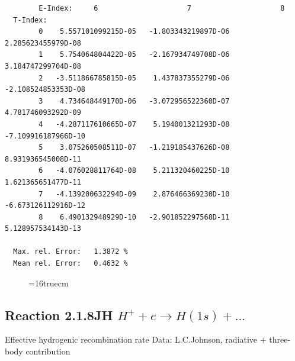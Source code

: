 \documentclass[12pt,dvips]{article}
\begin{document}
\begin{small}
\begin{verbatim}
        E-Index:     6                     7                     8
  T-Index:
        0    5.557101099215D-05   -1.803343219897D-06    2.285623455979D-08
        1    5.754064804422D-05   -2.167934749708D-06    3.184747299704D-08
        2   -3.511866785815D-05    1.437837355279D-06   -2.108524853353D-08
        3    4.734648449170D-06   -3.072956522360D-07    4.781746093292D-09
        4   -4.287117610665D-07    5.194001321293D-08   -7.109916187966D-10
        5    3.075260508511D-07   -1.219185437626D-08    8.931936545008D-11
        6   -4.076028811764D-08    5.211320460225D-10    1.621365651477D-11
        7   -4.139200632294D-09    2.876466369230D-10   -6.673126112916D-12
        8    6.490132948929D-10   -2.901852297568D-11    5.128957534143D-13

  Max. rel. Error:   1.3872 %
  Mean rel. Error:   0.4632 %

\end{verbatim}\end{small}
\begin{figure} \label{2.1.5FU}
\epsfxsize=16truecm
\end{figure}
\newpage

\subsection{
  Reaction 2.1.8JH  $ H^+ + e\rightarrow H(1s) + ...$
}

   Effective hydrogenic recombination rate
   Data: L.C.Johnson, radiative + three-body contribution
\end{document}
